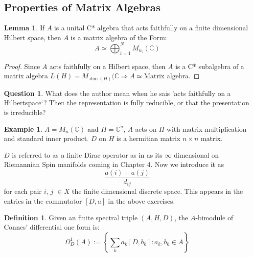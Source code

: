 \documentclass[a4paper]{article}
\theoremstyle{definition}
\newtheorem{definition}{Definition}
\theoremstyle{definition}
\newtheorem{question}{Question}
\theoremstyle{definition}
\newtheorem{example}{Example}
\theoremstyle{theorem}
\theoremstyle{theorem}
\newtheorem{lemma}{Lemma}
\theoremstyle{theorem}
\theoremstyle{definition}
\begin{document}
\subsection{Properties of Matrix Algebras}
\begin{lemma}
    If $A$ is a unital C* algebra that acts faithfully on a finite
    dimensional Hilbert space, then $A$ is a matrix algebra of the Form:
    \begin{equation}
        A \simeq \bigoplus _{i=1}^N M_{n_i}(\mathbb{C})
    \end{equation}
\end{lemma}
\begin{proof}
    Since $A$ acts faithfully on a Hilbert space, then $A$ is a C*
    subalgebra of a matrix algebra $L(H) = M_{\dim (H)}(\mathbb{C}
    \Rightarrow A \simeq \text{Matrix algebra}$.
\end{proof}

\begin{question}
    What does the author mean when he sais 'acts faithfully on a
    Hilbertspace`? Then the representation is fully reducible, or that the
    presentation is irreducible?
\end{question}

\begin{example}
    $A = M_n(\mathbb{C})$ and $H=\mathbb{C}^n$, $A$ acts on $H$ with matrix
    multiplication and standard inner product. $D$ on $H$ is a hermitian
    matrix $n\times n$ matrix.
\end{example}

$D$ is referred to as a finite Dirac operator as in as its $\infty$
dimensional on Riemannian Spin manifolds coming in Chapter 4. Now we
introduce it as
\begin{equation}
    \frac{a(i)-a(j)}{d_{ij}}
\end{equation}
for each pair $i$, $j$ $\in X$ the finite dimensional discrete space.
This appears in the entries in the commutator $[D, a]$ in the above
exercises.
\begin{definition}
    Given an finite spectral triple $(A, H, D)$, the $A$-bimodule of
    Connes' differential one form is:
    \begin{equation}
        \Omega _D ^1 (A) := \left\{ \sum _k a_k[D, b_k]: a_k, b_k \in A \right\}
    \end{equation}
\end{definition}
\end{document}
